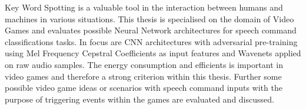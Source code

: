 
Key Word Spotting is a valuable tool in the interaction between humans and machines in various situations.
This thesis is specialised on the domain of Video Games and evaluates possible Neural Network architectures for speech command classifications tasks.
In focus are CNN architectures with adversarial pre-training using Mel Frequency Cepstral Coefficients as input features and Wavenets applied on raw audio samples.
The energy consumption and efficients is important in video games and therefore a strong criterion within this thesis.
Further some possible video game ideas or scenarios with speech command inputs with the purpose of triggering events within the games are evaluated and discussed.
